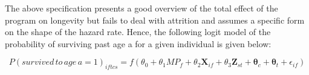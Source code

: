 The above specification presents a good overview of the total effect of the program on longevity but fails to deal with attrition and assumes a specific form on the shape of the hazard rate. Hence, the following logit model of the probability of surviving past age a for a given individual is given below:

$$
P(survived\,to\,age\,a=1)_{iftcs} = f(\theta_0 + \theta_1MP_f + \theta_2\mathbf{X}_{if} + \theta_3\mathbf{Z}_{st} + \mathbf{\theta}_c + \mathbf{\theta}_t + \epsilon_{if})
$$